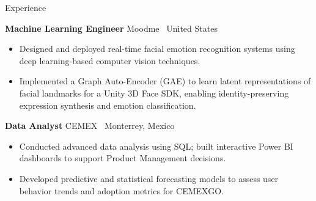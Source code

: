 \begin{rubric}{Experience}

\entry*[10/2023 -- 01/2024]
  \textbf{Machine Learning Engineer} \hfill Moodme \textbar\ United States
  \par
  \begin{itemize}\itemsep0.2em
    \item Designed and deployed real-time facial emotion recognition systems using deep learning-based computer vision techniques.
    \item Implemented a Graph Auto-Encoder (GAE) to learn latent representations of facial landmarks for a Unity 3D Face SDK, enabling identity-preserving expression synthesis and emotion classification.
  \end{itemize}

\entry*[04/2023 -- 08/2023]
  \textbf{Data Analyst} \hfill CEMEX \textbar\ Monterrey, Mexico
  \par
  \begin{itemize}\itemsep0.2em
    \item Conducted advanced data analysis using SQL; built interactive Power BI dashboards to support Product Management decisions.
    \item Developed predictive and statistical forecasting models to assess user behavior trends and adoption metrics for CEMEXGO.
  \end{itemize}

\end{rubric}
